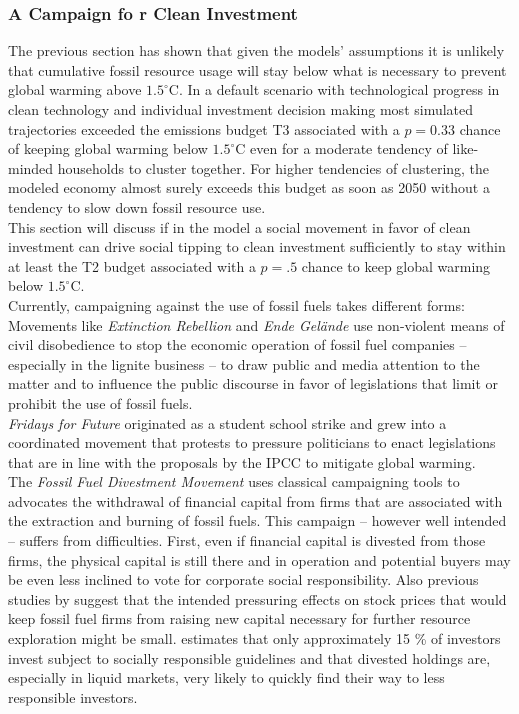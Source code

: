 \subsubsection{A Campaign fo r Clean Investment}
The previous section has shown that given the models' assumptions it is unlikely that cumulative fossil resource usage will stay below what is necessary to prevent global warming above $1.5^{\circ}$C. In a default scenario with technological progress in clean technology and individual investment decision making most simulated trajectories exceeded the emissions budget T3 associated with a $p=0.33$ chance of keeping global warming below $1.5^{\circ}$C even for a moderate tendency of like-minded households to cluster together. For higher tendencies of clustering, the modeled economy almost surely exceeds this budget as soon as 2050 without a tendency to slow down fossil resource use.\\

This section will discuss if in the model a social movement in favor of clean investment can drive social tipping to clean investment sufficiently to stay within at least the T2 budget associated with a $p=.5$ chance to keep global warming below $1.5^{\circ}$C.\\

Currently, campaigning against the use of fossil fuels takes different forms: \\

Movements like \textit{Extinction Rebellion} and \textit{Ende Gel\"{a}nde} use non-violent means of civil disobedience to stop the economic operation of fossil fuel companies -- especially in the lignite business -- to draw public and media attention to the matter and to influence the public discourse in favor of legislations that limit or prohibit the use of fossil fuels.\\

\textit{Fridays for Future} originated as a student school strike and grew into a coordinated movement that protests to pressure politicians to enact legislations that are in line with the proposals by the IPCC to mitigate global warming.\\

The \textit{Fossil Fuel Divestment Movement} uses classical campaigning tools to advocates the withdrawal of financial capital from firms that are associated with the extraction and burning of fossil fuels. This campaign -- however well intended -- suffers from difficulties. First, even if financial capital is divested from those firms, the physical capital is still there and in operation and potential buyers may be even less inclined to vote for corporate social responsibility. Also previous studies by \cite{Ans2013} suggest that the intended pressuring effects on stock prices that would keep fossil fuel firms from raising new capital necessary for further resource exploration might be small. \cite{SIF2014Report} estimates that only approximately 15 \% of investors invest subject to socially responsible guidelines and that divested holdings are, especially in liquid markets, very likely to quickly find their way to less responsible investors.\\

